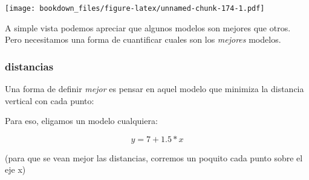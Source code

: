 \documentclass[]{book}
\newenvironment{Shaded}{\begin{snugshade}}{\end{snugshade}}
\newcommand{\DataTypeTok}[1]{\textcolor[rgb]{0.13,0.29,0.53}{#1}}
\newcommand{\DecValTok}[1]{\textcolor[rgb]{0.00,0.00,0.81}{#1}}
\newcommand{\FloatTok}[1]{\textcolor[rgb]{0.00,0.00,0.81}{#1}}
\newcommand{\KeywordTok}[1]{\textcolor[rgb]{0.13,0.29,0.53}{\textbf{#1}}}
\newcommand{\NormalTok}[1]{#1}
\newcommand{\OperatorTok}[1]{\textcolor[rgb]{0.81,0.36,0.00}{\textbf{#1}}}
\newcommand{\StringTok}[1]{\textcolor[rgb]{0.31,0.60,0.02}{#1}}
\begin{document}
\texttt{[image: bookdown\_files/figure-latex/unnamed-chunk-174-1.pdf]}

A simple vista podemos apreciar que algunos modelos son mejores que otros. Pero necesitamos una forma de cuantificar cuales son los \emph{mejores} modelos.

\hypertarget{distancias}{%
\subsubsection{distancias}\label{distancias}}

Una forma de definir \emph{mejor} es pensar en aquel modelo que minimiza la distancia vertical con cada punto:

Para eso, eligamos un modelo cualquiera:

\[ y= 7 + 1.5*x\]

(para que se vean mejor las distancias, corremos un poquito cada punto sobre el eje x)

\begin{Shaded}
\end{Shaded}
\end{document}
